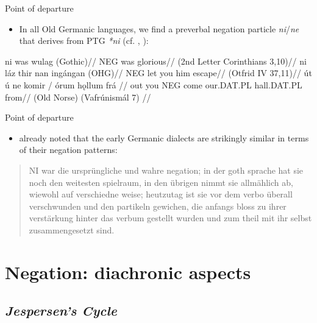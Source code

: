 \documentclass[xcolor=table, compress, %
handout
]{beamer}
\begin{document}
\begin{frame}{Point of departure}


\begin{itemize}
\item In all Old Germanic languages, we find a preverbal negation particle \textit{ni}/\textit{ne} that derives from PTG \textit{*ni} (cf. \citealt{Eythorsson1995}, \citealt{Eythorsson2002}):
\end{itemize}

\pex
\a
\begingl
\gla ni was wul\th ag \textup{(Gothic)}//
\glb \textsc{NEG} was glorious//
\glft (2nd Letter Corinthians 3,10)//
\endgl
\a
\begingl
\gla ni láz thir nan ingángan \textup{(OHG)}//
\glb \textsc{NEG} let you him escape//
\glft (Otfrid IV 37,11)//
\endgl
\a
\begingl
\gla út \th ú ne komir / órum hǫllum frá //
\glb out you \textsc{NEG} come {} our.\textsc{DAT.PL} hall.\textsc{DAT.PL} from//
\glft \textup{(Old Norse) (Vaf\th rú\dh nismál 7)} //
\endgl
\xe

\end{frame}

\begin{frame}{Point of departure}

\begin{itemize}
\item \citet[690]{Grimm1890} already noted that the early Germanic dialects are strikingly similar in terms of their negation patterns:
\end{itemize}

\begin{quote}
\raggedright
NI war die ursprüngliche und wahre negation; in der goth sprache hat sie noch den weitesten spielraum, in den übrigen nimmt sie allmählich ab, wiewohl auf verschiedne weise; heutzutag ist sie vor dem verbo überall verschwunden und den partikeln gewichen, die anfangs bloss zu ihrer verstärkung hinter das verbum gestellt wurden und zum theil mit ihr selbst zusammengesetzt sind. 
\end{quote}

\end{frame}



\section{Negation: diachronic aspects}
\subsection{\textit{Jespersen's Cycle}}
\end{document}

